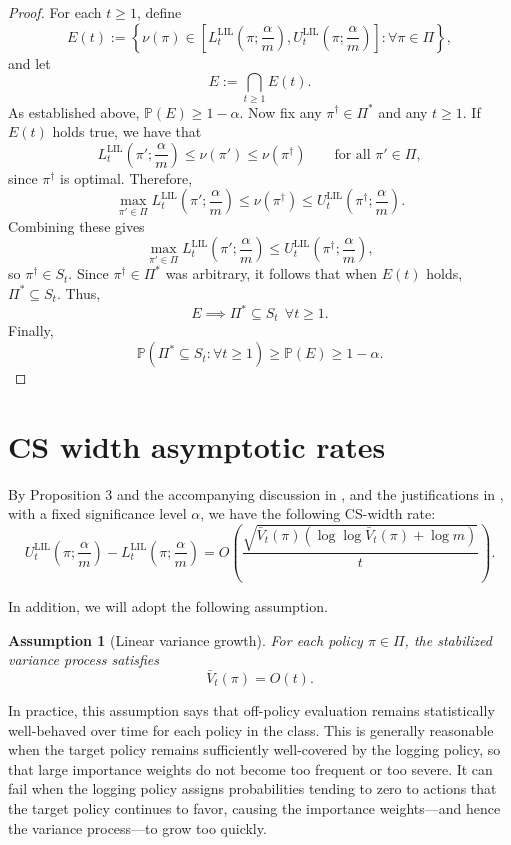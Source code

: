\documentclass[11pt]{article}
\newcommand{\PP}{\mathbb{P}}
\newcommand{\LIL}{\mathrm{LIL}}
\newtheorem{assumption}{Assumption}
\begin{document}
\begin{proof}
For each $t \ge 1$, define
\[
E(t) := \left\{\nu(\pi) \in \left[L_t^\LIL\left(\pi; \frac{\alpha}{m}\right), U_t^\LIL\left(\pi; \frac{\alpha}{m}\right)\right] : \forall \pi \in \Pi \right\},
\]
and let
\[
E := \bigcap_{t\ge1} E(t).
\]
As established above, $\PP(E) \ge 1-\alpha$. Now fix any $\pi^\dagger \in \Pi^*$ and any $t \ge 1$. If $E(t)$ holds true, we have that
\[
L_t^\LIL\left(\pi'; \frac{\alpha}{m}\right) \le \nu(\pi') \le \nu(\pi^\dagger)
\qquad \text{for all } \pi' \in \Pi,
\]
since $\pi^\dagger$ is optimal. Therefore,
\[
\max_{\pi'\in\Pi} L_t^\LIL\left(\pi'; \frac{\alpha}{m}\right) \le \nu(\pi^\dagger) \le U_t^\LIL\left(\pi^\dagger; \frac{\alpha}{m}\right).
\]
Combining these gives
\[
\max_{\pi'\in\Pi} L_t^\LIL\left(\pi'; \frac{\alpha}{m}\right)
\le
U_t^\LIL\left(\pi^\dagger; \frac{\alpha}{m}\right),
\]
so $\pi^\dagger \in S_t$. Since $\pi^\dagger \in \Pi^*$ was arbitrary, it follows that when $E(t)$ holds, $\Pi^* \subseteq S_t$. Thus,
\[
E \implies \Pi^* \subseteq S_t \ \ \forall t\ge1.
\]
Finally,
\[
\PP\left(\Pi^* \subseteq S_t : \forall t \ge 1\right)
\ge
\PP(E)
\ge
1-\alpha.
\]
\end{proof}

\section{CS width asymptotic rates}

By Proposition 3 and the accompanying discussion in \citet{waudby-smith_anytime-valid_2024}, and the justifications in \citet{howard_time-uniform_2021}, with a fixed significance level $\alpha$, we have the following CS-width rate:
\begin{equation}
U_t^{\LIL}\left(\pi;\frac{\alpha}{m}\right) - L_t^{\LIL}\left(\pi;\frac{\alpha}{m}\right)
= O\!\left(\frac{\sqrt{\bar V_t(\pi)\left(\log\log \bar V_t(\pi)+\log m\right)}}{t}\right).
\label{eq:lil_rate1}
\end{equation}

\noindent In addition, we will adopt the following assumption.

\begin{assumption}[Linear variance growth]
For each policy $\pi \in \Pi$, the stabilized variance process satisfies
\[
\bar V_t(\pi)=O(t).
\]
\label{lab:assumption_1}
\end{assumption}

\noindent In practice, this assumption says that off-policy evaluation remains statistically well-behaved over time for each policy in the class. This is generally reasonable when the target policy remains sufficiently well-covered by the logging policy, so that large importance weights do not become too frequent or too severe. It can fail when the logging policy assigns probabilities tending to zero to actions that the target policy continues to favor, causing the importance weights---and hence the variance process---to grow too quickly.
\end{document}
